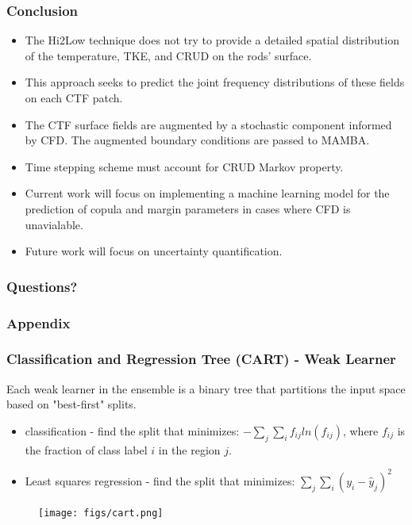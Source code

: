 \documentclass[t, pdftex]{beamer}
\begin{document}
\begin{frame}
\frametitle{Conclusion}
\begin{itemize}
\item The Hi2Low technique does not try to provide a detailed spatial distribution
of the temperature, TKE, and CRUD on the rods' surface.
\item This approach seeks to predict the joint frequency distributions of these fields on each CTF patch.
\item The CTF surface fields are augmented by a stochastic component informed by CFD.  The augmented boundary conditions are passed to MAMBA.
\item Time stepping scheme must account for CRUD Markov property.
\item Current work will focus on implementing a machine learning model for the prediction of copula and margin parameters in cases where CFD is unavialable.
\item Future work will focus on uncertainty quantification.
\end{itemize}
\end{frame}

\begin{frame}
\frametitle{Questions?}
\end{frame}

\lastframe%

\begin{frame}
\frametitle{Appendix}
\end{frame}

\begin{frame}[shrink=10]
\frametitle{Classification and Regression Tree (CART) - Weak Learner}
Each weak learner in the ensemble is a binary tree that partitions the input space based on "best-first" splits.  
\begin{itemize}
\item classification - find the split that minimizes: $-\sum_j\sum_i f_{ij} ln(f_{ij})$, where $f_{ij}$ is the fraction of class label $i$ in the region $j$.
\item Least squares regression - find the split that minimizes: $\sum_j\sum_i(y_i - \hat y_{j})^2$
\end{itemize}

\begin{figure}[!htbp]
\centering
\texttt{[image: figs/cart.png]}
\label{model_overview}
\end{figure}
\end{frame}
\end{document}
